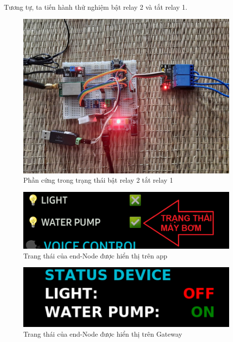 \indent Tương tự, ta tiến hành thử nghiệm bật relay 2 và tắt relay 1.
\begin{figure}[H]
	\centering
	\includegraphics[scale=0.2]{Chapter 4/image chapter 4/R2ONR1OFF.jpg}
	\caption[Phần cứng trong trạng thái bật relay 2 tắt relay 1]{Phần cứng trong trạng thái bật relay 2 tắt relay 1}
	\label{hinh48}
\end{figure}
\begin{figure}[H]
	\centering
	\includegraphics[scale=0.2]{Chapter 4/image chapter 4/appR1OFFR2ON.png}
	\caption[Trang thái của end-Node được hiển thị trên app]{Trang thái của end-Node được hiển thị trên app}
	\label{hinh49}
\end{figure}
\begin{figure}[H]
	\centering
	\includegraphics[scale=0.3]{Chapter 4/image chapter 4/Relay1OFF-Relay2ON.png}
	\caption[Trang thái của end-Node được hiển thị trên Gateway]{Trang thái của end-Node được hiển thị trên Gateway}
	\label{hinh410}
\end{figure}